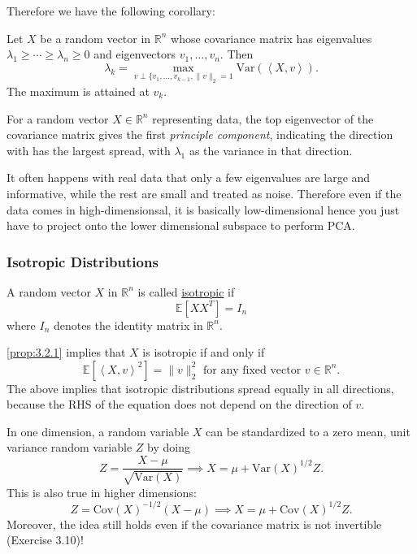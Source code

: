 Therefore we have the following corollary: 
\begin{corollary}[PCA]
\label{cor:3.2.3}
Let $X$ be a random vector in $\mathbb{R}^n$ whose covariance matrix has eigenvalues $\lambda_1 \geq \cdots 
\geq \lambda_n \geq 0$ and eigenvectors $v_1, \dots, v_n$. Then 
\[ \lambda_k = \max_{v \perp \{v_1, \dots, v_{k - 1}, \lVert v \rVert_{2} = 1} 
\mathrm{Var}(\left\langle X, v \right\rangle). \]
The maximum is attained at $v_k$.
\end{corollary}	

For a random vector $X \in \mathbb{R}^n$ representing data, 
the top eigenvector of the covariance matrix gives the first \textit{principle component}, indicating the 
direction with has the largest spread, with $\lambda_1$ as the variance in that direction.

\begin{remark}
\label{rmk:3.2.4}
It often happens with real data that only a few eigenvalues are large and informative, while the rest are 
small and treated as noise. Therefore even if the data comes in high-dimensionsal, it is basically 
low-dimensional hence you just have to project onto the lower dimensional subspace to perform PCA.
\end{remark}


\subsubsection{Isotropic Distributions}
\begin{definition}[]
\label{def:3.2.5}
A random vector $X$ in $\mathbb{R}^n$ is called \underline{isotropic} if 
\[ \mathbb{E}[XX^T] = I_n \]
where $I_n$ denotes the identity matrix in $\mathbb{R}^n$.
\end{definition}

\cref{prop:3.2.1} implies that $X$ is isotropic if and only if 
\[ \mathbb{E}[\left\langle X, v \right\rangle^2] = \lVert v \rVert_{2}^2 \text{ for any fixed 
vector } v \in \mathbb{R}^n. \]
The above implies that isotropic distributions spread equally in all directions, because the RHS of the 
equation does not depend on the direction of $v$.

\begin{note}[Standardizing]
In one dimension, a random variable $X$ can be standardized to a zero mean, unit variance random variable 
$Z$ by doing 
\[ Z = \frac{X - \mu}{\sqrt{\mathrm{Var}(X)}} \implies X = \mu + \mathrm{Var}(X)^{1/2}Z. \]
This is also true in higher dimensions: 
\[ Z = \mathrm{Cov}(X)^{-1/2}(X - \mu) \implies X = \mu + \mathrm{Cov}(X)^{1/2}Z. \]
Moreover, the idea still holds even if the covariance matrix is not invertible (Exercise 3.10)!
\end{note}



